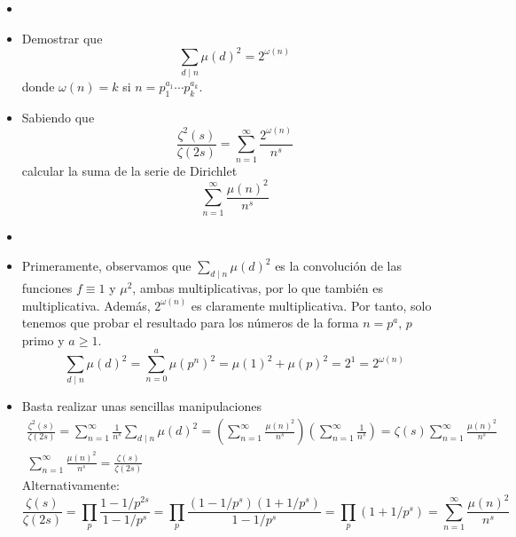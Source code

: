 \documentclass[twoside]{article}
\begin{document}
\begin{ejercicio}{5}
\begin{itemize}
\item[]
\item Demostrar que 
\[
\sum_{d\mid n} \mu(d)^2 = 2^{\omega(n)}
\]
donde $\omega(n)=k$ si $n=p_1^{a_1}\cdots p_k^{a_k}$.
\item Sabiendo que
\[
\frac{\zeta^2(s)}{\zeta(2s)}=\sum_{n=1}^\infty \frac{2^{\omega(n)}}{n^s}
\]
calcular la suma de la serie de Dirichlet
$$
\sum_{n=1}^\infty \frac{\mu(n)^2}{n^s}
$$
\end{itemize}
\begin{sol}
\begin{itemize}
\item[]
\item Primeramente, observamos que $\sum_{d\mid n} \mu(d)^2$ es la convolución de las funciones $f\equiv 1$ y $\mu^2$, ambas multiplicativas, por lo que también es multiplicativa. Además, $2^{\omega(n)}$ es claramente multiplicativa. Por tanto, solo tenemos que probar el resultado para los números de la forma $n=p^a$, $p$ primo y $a\geq 1$.
\[
\sum_{d\mid n} \mu(d)^2 = \sum_{n=0}^a \mu(p^n)^2 = \mu(1)^2 + \mu(p)^2 = 2^1 = 2^{\omega(n)}
\]
\item Basta realizar unas sencillas manipulaciones
\begin{gather*}
\frac{\zeta^2(s)}{\zeta(2s)}=\sum_{n=1}^\infty \frac{1}{n^s}\sum_{d\mid n} \mu(d)^2 = \left(\sum_{n=1}^\infty \frac{\mu(n)^2}{n^s}\right)\left(\sum_{n=1}^\infty \frac{1}{n^s}\right) = \zeta(s)\sum_{n=1}^\infty \frac{\mu(n)^2}{n^s}\\
\sum_{n=1}^\infty \frac{\mu(n)^2}{n^s} = \frac{\zeta(s)}{\zeta(2s)}
\end{gather*}
Alternativamente:
\[ \frac{ζ(s)}{ζ(2s)} = \prod_p \frac{1-1/p^{2s}}{1-1/p^s} = \prod_p \frac{(1-1/p^s)(1+1/p^s)}{1-1/p^s} = \prod_p (1+1/p^s) = \sum_{n=1}^{∞} \frac{μ(n)^2}{n^s} \]
\end{itemize}
\end{sol}
\end{ejercicio}
\newpage
\end{document}
